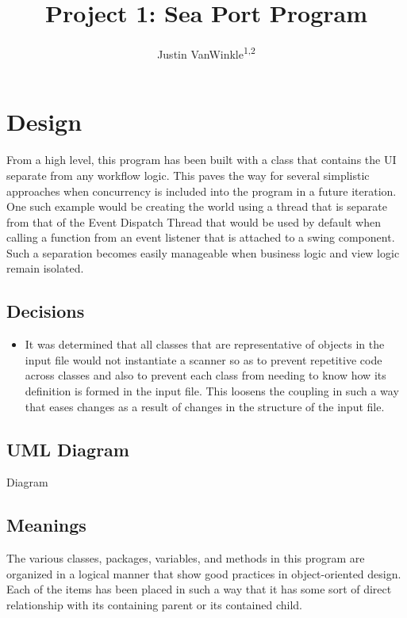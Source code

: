 \documentclass[english,man]{apa6}
\title{Project 1: Sea Port Program}
\author{Justin VanWinkle\textsuperscript{1,2}}
\affiliation{
    \vspace{0.5cm}
          \textsuperscript{1} University of Maryland University College\\
          \textsuperscript{2} Wycliffe Associates, Inc.  }
\providecommand{\tightlist}{%
  \setlength{\itemsep}{0pt}\setlength{\parskip}{0pt}}
\begin{document}
\maketitle

\setcounter{secnumdepth}{0}



\section{Design}\label{design}

From a high level, this program has been built with a class that
contains the UI separate from any workflow logic. This paves the way for
several simplistic approaches when concurrency is included into the
program in a future iteration. One such example would be creating the
world using a thread that is separate from that of the Event Dispatch
Thread that would be used by default when calling a function from an
event listener that is attached to a swing component. Such a separation
becomes easily manageable when business logic and view logic remain
isolated.

\subsection{Decisions}\label{decisions}

\begin{itemize}
\tightlist
\item
  It was determined that all classes that are representative of objects
  in the input file would not instantiate a scanner so as to prevent
  repetitive code across classes and also to prevent each class from
  needing to know how its definition is formed in the input file. This
  loosens the coupling in such a way that eases changes as a result of
  changes in the structure of the input file.
\end{itemize}

\subsection{UML Diagram}\label{uml-diagram}

Diagram

\subsection{Meanings}\label{meanings}

The various classes, packages, variables, and methods in this program
are organized in a logical manner that show good practices in
object-oriented design. Each of the items has been placed in such a way
that it has some sort of direct relationship with its containing parent
or its contained child.
\end{document}
